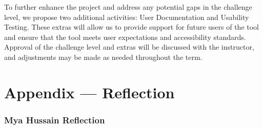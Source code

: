 \documentclass{article}
\begin{document}
\noindent
To further enhance the project and address any potential gaps in the challenge level,
we propose two additional activities: User Documentation and Usability Testing.
These extras will allow us to provide support for future users of the tool and
ensure that the tool meets user expectations and accessibility standards.\\

\noindent
Approval of the challenge level and extras will be discussed with the instructor,
and adjustments may be made as needed throughout the term.

\newpage{}

\section*{Appendix --- Reflection}

\subsubsection*{Mya Hussain Reflection}
\end{document}
